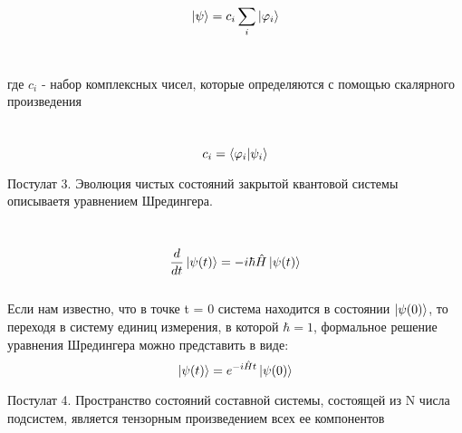 \documentclass[a4paper, 10pt]{article}
\begin{document}
        \begin{equation}
            \ket{\psi}= c_i \sum_i \ket{\varphi_i}
        \end{equation}
        \\ 
        \begin{itshape}
            где $c_i$ - набор комплексных чисел, которые определяются с помощью скалярного произведения
        \end{itshape}
        \\

        \begin{equation}
            c_i = \bra{\varphi_i} \ket{\psi_i}
        \end{equation}

        
        \begin{itshape}
            Постулат 3. Эволюция чистых состояний закрытой квантовой системы описываетя уравнением Шредингера.
        \end{itshape}
        \\

        \begin{equation}
            \frac{d}{dt} \ket{\psi(t)} = -i \hbar \hat{H} \ket{\psi(t)}
        \end{equation}
        \\

        Если нам известно, что в точке t = 0 система находится в состоянии $\ket{\psi(0)}$, то переходя в систему единиц измерения, в которой $\hbar = 1$, формальное решение уравнения Шредингера можно представить в виде:
        \\
        \begin{equation}
            \ket{\psi(t)} = e^{-i\hat{H}t} \ket{\psi(0)}
        \end{equation}

        \begin{itshape}
            Постулат 4. Пространство состояний составной системы, состоящей из N числа подсистем, является тензорным произведением всех ее компонентов
        \end{itshape}
        
    
\end{document}
